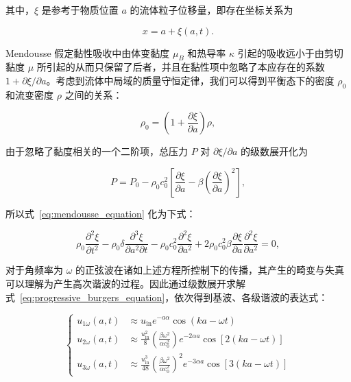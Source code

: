 其中，$\xi$ 是参考于物质位置 $a$ 的流体粒子位移量，即存在坐标关系为

\begin{equation}
  x = a + \xi(a,t).
\end{equation}

Mendousse 假定黏性吸收中由体变黏度 $\mu_{B}$ 和热导率 $\kappa$ 引起的吸收远小于由剪切黏度 $\mu$ 所引起的从而只保留了后者，并且在黏性项中忽略了本应存在的系数 $1+\partial\xi/\partial a$。考虑到流体中局域的质量守恒定律，我们可以得到平衡态下的密度 $\rho_{0}$ 和流变密度 $\rho$ 之间的关系：

\begin{equation}
  \rho_{0} = \left(1 + \frac{\partial\xi}{\partial a}\right)\rho,
\end{equation}

由于忽略了黏度相关的一个二阶项，总压力 $P$ 对 $\partial\xi/\partial a$ 的级数展开化为

\begin{equation}
  P = P_{0} - \rho_{0}c_{0}^{2}\left[\frac{\partial\xi}{\partial a} - \beta\left(\frac{\partial\xi}{\partial a}\right)^{2}\right],
\end{equation}

所以式~\eqref{eq:mendousse_equation} 化为下式：

\begin{equation}
  \rho_{0}\frac{\partial^{2}\xi}{\partial t^{2}} - \rho_{0}\delta\frac{\partial^{3}\xi}{\partial a^{2}\partial t} - \rho_{0}c_{0}^{2}\frac{\partial^{2}\xi}{\partial a^{2}} + 2\rho_{0}c_{0}^{2}\beta\frac{\partial\xi}{\partial a}\frac{\partial^{2}\xi}{\partial a^{2}} = 0,\label{eq:progressive_burgers_equation}
\end{equation}

对于角频率为 $\omega$ 的正弦波在诸如上述方程所控制下的传播，其产生的畸变与失真可以理解为产生高次谐波的过程。因此通过级数展开求解式~\eqref{eq:progressive_burgers_equation}，依次得到基波、各级谐波的表达式：

\begin{equation}
  \begin{cases}
    u_{1\omega}(a,t) &\approx u_{\text{in}}e^{-a\alpha}\cos{(ka-\omega t)}\\
    u_{2\omega}(a,t) &\approx \frac{u_{\text{in}}^{2}}{8}\left(\frac{\beta\omega^{2}}{\alpha c_{0}^{2}}\right)e^{-2\alpha a}\cos{[2(ka-\omega t)]}\\
    u_{3\omega}(a,t) &\approx \frac{u_{\text{in}}^{3}}{48}\left(\frac{\beta\omega^{2}}{\alpha c_{0}^{2}}\right)^{2}e^{-3\alpha a}\cos{[3(ka-\omega t)]}
    \end{cases}
\end{equation}

